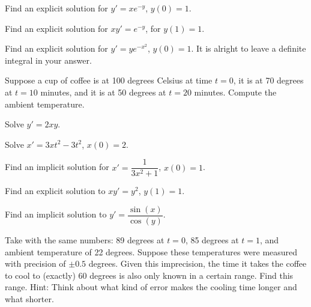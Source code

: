 \begin{exercise}
Find an explicit solution for $y' = xe^{-y}$, $y(0)=1$.
\end{exercise}

\begin{exercise}
Find an explicit solution for $xy' = e^{-y}$, for $y(1)=1$.
\end{exercise}

\begin{exercise}
Find an explicit solution for $y' = ye^{-x^2}$, $y(0)=1$.  It is alright to
leave a definite integral in your answer.
\end{exercise}

\begin{exercise}
Suppose a cup of coffee is at 100 degrees Celsius at time $t=0$,
it is at 70 degrees at $t=10$ minutes, and it is at 50 degrees at $t=20$
minutes.  Compute the ambient temperature.
\end{exercise}

\setcounter{exercise}{100}

\begin{exercise}
Solve $y'=2xy$.
\end{exercise}

\begin{exercise}
Solve $x'=3xt^2-3t^2$, $x(0)=2$.
\end{exercise}

\begin{exercise}
Find an implicit solution for
$x'=\dfrac{1}{3x^2+1}$, $x(0)=1$.
\end{exercise}

\begin{exercise}
Find an explicit solution to $x y' = y^2$, $y(1) = 1$.
\end{exercise}

\begin{exercise}
Find an implicit solution to $y' = \dfrac{\sin(x)}{\cos(y)}$.
\end{exercise}

\begin{exercise}
Take  with the same numbers: 89 degrees at
$t=0$, 85 degrees at $t=1$, and ambient temperature
of 22 degrees.  Suppose these temperatures were measured with precision of
$\pm 0.5$ degrees.  Given this imprecision, the time
it takes the coffee to cool to (exactly) 60 degrees is also only known in a
certain range.  Find this range.  Hint: Think about what kind of error makes
the cooling time longer and what shorter.
\end{exercise}

